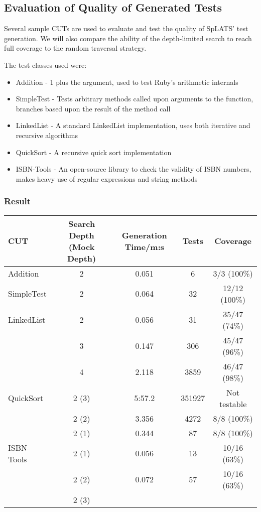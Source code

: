   \subsection{Evaluation of Quality of Generated Tests}
    Several sample CUTs are used to evaluate and test the quality of SpLATS'
test generation. We will also compare the ability of the depth-limited search to
reach full coverage to the random traversal strategy.

    The test classes used were:
    \begin{itemize}
      \item Addition - 1 plus the argument, used to test Ruby's arithmetic
internals
      \item SimpleTest - Tests arbitrary methods called upon arguments to the
function, branches based upon the result of the method call
      \item LinkedList - A standard LinkedList implementation, uses both
iterative and recursive algorithms
      \item QuickSort - A recursive quick sort implementation
      \item ISBN-Tools - An open-source library to check the validity of ISBN
numbers, makes heavy use of regular expressions and string methods
    \end{itemize}

  \subsubsection{Result}

    \begin{tabular}{l|cccc}
CUT & Search Depth (Mock Depth) & Generation Time/m:s & Tests & Coverage \\
\hline
Addition & 2 & 0.051 & 6 & 3/3 (100\%) \\
\hline
SimpleTest & 2 & 0.064 & 32 & 12/12 (100\%) \\
\hline
LinkedList & 2 & 0.056 & 31 & 35/47 (74\%) \\
& 3 & 0.147 & 306 & 45/47 (96\%) \\
& 4 & 2.118 & 3859 & 46/47 (98\%)\\
\hline
QuickSort & 2 (3) & 5:57.2 & 351927 & Not testable\\
& 2 (2) & 3.356 & 4272 & 8/8 (100\%) \\
& 2 (1) & 0.344 & 87 & 8/8 (100\%) \\
\hline
ISBN-Tools & 2 (1) & 0.056 & 13 & 10/16 (63\%) \\
& 2 (2) & 0.072 & 57 & 10/16 (63\%) \\
& 2 (3) & & & \\
\end{tabular}

